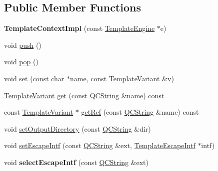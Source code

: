 \subsection*{Public Member Functions}
\begin{DoxyCompactItemize}
\item 
\mbox{\label{class_template_context_impl_a6da4cfdaac8611752bd98c42a5d6b1fa}} 
{\bfseries Template\+Context\+Impl} (const \mbox{\hyperlink{class_template_engine}{Template\+Engine}} $\ast$e)
\item 
void \mbox{\hyperlink{class_template_context_impl_a006f67f94724147908dda84dd8522d34}{push}} ()
\item 
void \mbox{\hyperlink{class_template_context_impl_af8856e3207a53fad3f700353d71b575e}{pop}} ()
\item 
void \mbox{\hyperlink{class_template_context_impl_a1ff06ac572e4d0456bca3feeac5f96f7}{set}} (const char $\ast$name, const \mbox{\hyperlink{class_template_variant}{Template\+Variant}} \&v)
\item 
\mbox{\hyperlink{class_template_variant}{Template\+Variant}} \mbox{\hyperlink{class_template_context_impl_a0609e62251b223bbd14851738fa10727}{get}} (const \mbox{\hyperlink{class_q_c_string}{Q\+C\+String}} \&name) const
\item 
const \mbox{\hyperlink{class_template_variant}{Template\+Variant}} $\ast$ \mbox{\hyperlink{class_template_context_impl_aba8ebc4a96d6a1a52f0f16d00a658770}{get\+Ref}} (const \mbox{\hyperlink{class_q_c_string}{Q\+C\+String}} \&name) const
\item 
void \mbox{\hyperlink{class_template_context_impl_a1178c98a679ecb3e02722b4e8f39c1e3}{set\+Output\+Directory}} (const \mbox{\hyperlink{class_q_c_string}{Q\+C\+String}} \&dir)
\item 
void \mbox{\hyperlink{class_template_context_impl_a812fdb58baecd7830e42ef8508a005e8}{set\+Escape\+Intf}} (const \mbox{\hyperlink{class_q_c_string}{Q\+C\+String}} \&ext, \mbox{\hyperlink{class_template_escape_intf}{Template\+Escape\+Intf}} $\ast$intf)
\item 
\mbox{\label{class_template_context_impl_aa7a5421a3e04b6fdf07c4734b8dc8f46}} 
void {\bfseries select\+Escape\+Intf} (const \mbox{\hyperlink{class_q_c_string}{Q\+C\+String}} \&ext)
\item 
\mbox{\label{class_template_context_impl_aaf4534a93bb799f160385999259d3b7f}} 

\end{DoxyCompactItemize}
